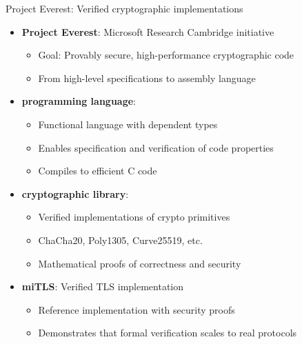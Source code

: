 \documentclass[aspectratio=169, lualatex, handout]{beamer}
\begin{document}
\begin{frame}{Project Everest: Verified cryptographic implementations}
	\begin{itemize}
		\item \textbf{Project Everest}: Microsoft Research Cambridge initiative
		      \begin{itemize}
			      \item Goal: Provably secure, high-performance cryptographic code
			      \item From high-level specifications to assembly language
		      \end{itemize}
		\item \textbf{\fstar programming language}:
		      \begin{itemize}
			      \item Functional language with dependent types
			      \item Enables specification and verification of code properties
			      \item Compiles to efficient C code
		      \end{itemize}
		\item \textbf{\haclstar cryptographic library}:
		      \begin{itemize}
			      \item Verified implementations of crypto primitives
			      \item ChaCha20, Poly1305, Curve25519, etc.
			      \item Mathematical proofs of correctness and security
		      \end{itemize}
		\item \textbf{miTLS}: Verified TLS implementation
		      \begin{itemize}
			      \item Reference implementation with security proofs
			      \item Demonstrates that formal verification scales to real protocols
		      \end{itemize}
	\end{itemize}
\end{frame}
\end{document}
